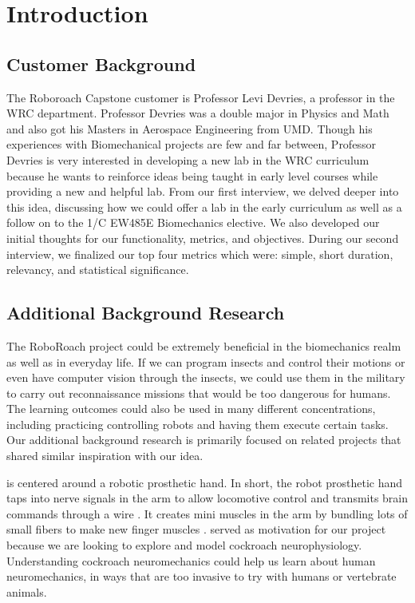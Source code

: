 \documentclass{article}
\begin{document}
\section{Introduction}
\subsection{Customer Background}
 The Roboroach Capstone customer is Professor Levi Devries, a professor in the WRC department. Professor Devries was a double major in Physics and Math and also got his Masters in Aerospace Engineering from UMD. Though his experiences with Biomechanical projects are few and far between, Professor Devries is very interested in developing a new lab in the WRC curriculum because he wants to reinforce ideas being taught in early level courses while providing a new and helpful lab. From our first interview, we delved deeper into this idea, discussing how we could offer a lab in the early curriculum as well as a follow on to the 1/C EW485E Biomechanics elective. We also developed our initial thoughts for our functionality, metrics, and objectives. During our second interview, we finalized our top four metrics which were: simple, short duration, relevancy, and statistical significance. 

\subsection{Additional Background Research}

 The RoboRoach project could be extremely beneficial in the biomechanics realm as well as in everyday life. If we can program insects and control their motions or even have computer vision through the insects, we could use them in the military to carry out reconnaissance missions that would be too dangerous for humans. The learning outcomes could also be used in many different concentrations, including practicing controlling robots and having them execute certain tasks. Our additional background research is primarily focused on related projects that shared similar inspiration with our idea. 



\cite{servick2020minimuscles} is centered around a robotic prosthetic hand. 
In short, the robot prosthetic hand taps into nerve signals in the arm to allow locomotive control and transmits brain commands through a wire \cite{servick2020minimuscles}. It creates mini muscles in the arm by bundling lots of small fibers to make new finger muscles \cite{servick2020minimuscles}. \cite{servick2020minimuscles} served as motivation for our project because we are looking to explore and model cockroach neurophysiology. Understanding cockroach neuromechanics could help us learn about human neuromechanics, in ways that are too invasive to try with humans or vertebrate animals. 
\end{document}
